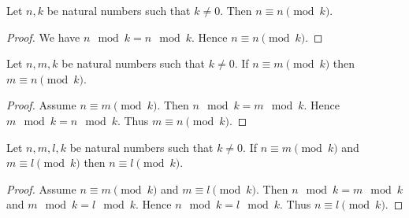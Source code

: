 \documentclass[10pt]{article}
\begin{document}
  \begin{forthel}
    \begin{proposition}
      Let $n, k$ be natural numbers such that $k \neq 0$.
      Then $n \equiv n \pmod{k}$.
    \end{proposition}
    \begin{proof}
      We have $n \mod k = n \mod k$.
      Hence $n \equiv n \pmod{k}$.
    \end{proof}
  \end{forthel}

  \begin{forthel}
    \begin{proposition}
      Let $n, m, k$ be natural numbers such that $k \neq 0$.
      If $n \equiv m \pmod{k}$ then $m \equiv n \pmod{k}$.
    \end{proposition}
    \begin{proof}
      Assume $n \equiv m \pmod{k}$.
      Then $n \mod k = m \mod k$.
      Hence $m \mod k = n \mod k$.
      Thus $m \equiv n \pmod{k}$.
    \end{proof}
  \end{forthel}

  \begin{forthel}
    \begin{proposition}
      Let $n, m, l, k$ be natural numbers such that $k \neq 0$.
      If $n \equiv m \pmod{k}$ and $m \equiv l \pmod{k}$ then $n \equiv l \pmod{k}$.
    \end{proposition}
    \begin{proof}
      Assume $n \equiv m \pmod{k}$ and $m \equiv l \pmod{k}$.
      Then $n \mod k = m \mod k$ and $m \mod k = l \mod k$.
      Hence $n \mod k = l \mod k$.
      Thus $n \equiv l \pmod{k}$.
    \end{proof}
  \end{forthel}
\end{document}
